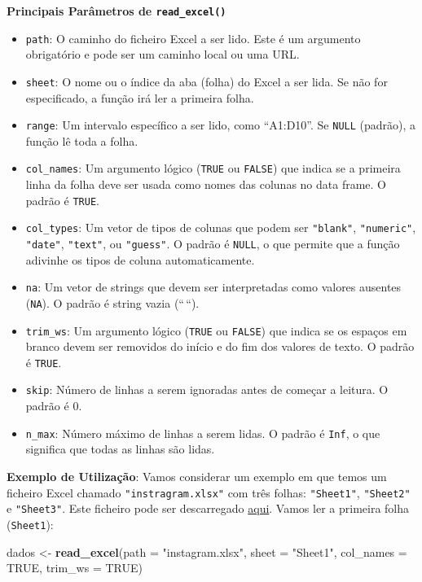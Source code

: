 \documentclass[
]{book}
\newenvironment{Shaded}{\begin{snugshade}}{\end{snugshade}}
\newcommand{\AttributeTok}[1]{\textcolor[rgb]{0.13,0.29,0.53}{#1}}
\newcommand{\ConstantTok}[1]{\textcolor[rgb]{0.56,0.35,0.01}{#1}}
\newcommand{\FunctionTok}[1]{\textcolor[rgb]{0.13,0.29,0.53}{\textbf{#1}}}
\newcommand{\NormalTok}[1]{#1}
\newcommand{\OtherTok}[1]{\textcolor[rgb]{0.56,0.35,0.01}{#1}}
\newcommand{\StringTok}[1]{\textcolor[rgb]{0.31,0.60,0.02}{#1}}
\providecommand{\tightlist}{%
  \setlength{\itemsep}{0pt}\setlength{\parskip}{0pt}}
\begin{document}
\textbf{Principais Parâmetros de \texttt{read\_excel()}}

\begin{itemize}
\tightlist
\item
  \texttt{path}: O caminho do ficheiro Excel a ser lido. Este é um argumento
  obrigatório e pode ser um caminho local ou uma URL.
\item
  \texttt{sheet}: O nome ou o índice da aba (folha) do Excel a ser lida. Se
  não for especificado, a função irá ler a primeira folha.
\item
  \texttt{range}: Um intervalo específico a ser lido, como ``A1:D10''. Se
  \texttt{NULL} (padrão), a função lê toda a folha.
\item
  \texttt{col\_names}: Um argumento lógico (\texttt{TRUE} ou \texttt{FALSE}) que indica se a
  primeira linha da folha deve ser usada como nomes das colunas no
  data frame. O padrão é \texttt{TRUE}.
\item
  \texttt{col\_types}: Um vetor de tipos de colunas que podem ser \texttt{"blank"},
  \texttt{"numeric"}, \texttt{"date"}, \texttt{"text"}, ou \texttt{"guess"}. O padrão é \texttt{NULL}, o
  que permite que a função adivinhe os tipos de coluna
  automaticamente.
\item
  \texttt{na}: Um vetor de strings que devem ser interpretadas como valores
  ausentes (\texttt{NA}). O padrão é string vazia (``\,``).
\item
  \texttt{trim\_ws}: Um argumento lógico (\texttt{TRUE} ou \texttt{FALSE}) que indica se os
  espaços em branco devem ser removidos do início e do fim dos valores
  de texto. O padrão é \texttt{TRUE}.
\item
  \texttt{skip}: Número de linhas a serem ignoradas antes de começar a
  leitura. O padrão é 0.
\item
  \texttt{n\_max}: Número máximo de linhas a serem lidas. O padrão é \texttt{Inf}, o
  que significa que todas as linhas são lidas.
\end{itemize}

\textbf{Exemplo de Utilização}: Vamos considerar um exemplo em que temos um
ficheiro Excel chamado \texttt{"instragram.xlsx"} com três folhas: \texttt{"Sheet1"},
\texttt{"Sheet2"} e \texttt{"Sheet3"}. Este ficheiro pode ser descarregado
\href{https://renatorpaula.wixsite.com/renato/laboratorio-estatistica}{aqui}.
Vamos ler a primeira folha (\texttt{Sheet1}):

\begin{Shaded}
\begin{Highlighting}[]
\NormalTok{dados }\OtherTok{\textless{}{-}} \FunctionTok{read\_excel}\NormalTok{(}\AttributeTok{path =} \StringTok{"instagram.xlsx"}\NormalTok{,}
                    \AttributeTok{sheet =} \StringTok{"Sheet1"}\NormalTok{,}
                    \AttributeTok{col\_names =} \ConstantTok{TRUE}\NormalTok{,}
                    \AttributeTok{trim\_ws =} \ConstantTok{TRUE}\NormalTok{)}
\end{Highlighting}
\end{Shaded}
\end{document}
